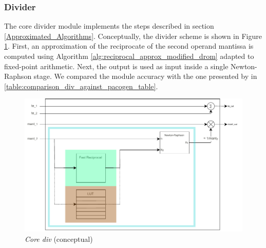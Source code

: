 \subsubsection{Divider}\label{divider_hardware_ppu}

The core divider module implements the steps described in section \ref{Approximated_Algorithms}.
Conceptually, the divider scheme is shown in Figure \ref{fig:nr_schematic}.
First, an approximation of the reciprocate of the second operand mantissa is computed using Algorithm \ref{alg:reciprocal_approx_modified_drom} adapted to fixed-point arithmetic.
Next, the output is used as input inside a single Newton-Raphson stage.
We compared the module accuracy with the one presented by \cite{PACoGen} in \ref{table:comparison_div_against_pacogen_table}.

    \begin{figure}
        \includegraphics[width=1\textwidth]{figures/newton_raphson_drawing.drawio.pdf}
        \caption{\textit{Core div} (conceptual)}
        \label{fig:nr_schematic}
    \end{figure}









